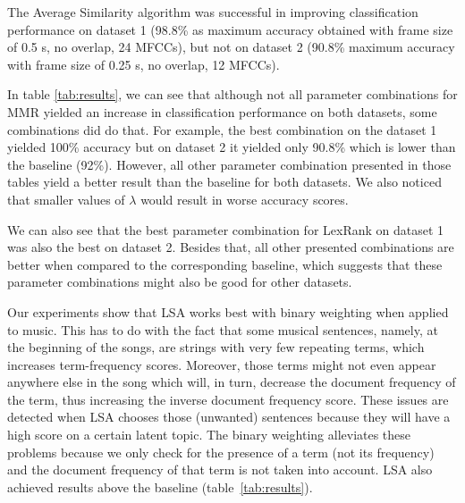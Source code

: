 \documentclass[11pt,onecolumn,draftcls]{IEEEtran}
\begin{document}
The Average Similarity algorithm was successful in improving classification
performance on dataset 1 (98.8\% as maximum accuracy obtained with frame size of
0.5 s, no overlap, 24 \ac{MFCC}s), but not on dataset 2 (90.8\% maximum accuracy
with frame size of 0.25 s, no overlap, 12 \ac{MFCC}s).

In table \ref{tab:results}, we can see that although not all parameter
combinations for \ac{MMR} yielded an increase in classification performance on
both datasets, some combinations did do that. For example, the best combination on
the dataset 1 yielded 100\% accuracy but on dataset 2 it yielded only 90.8\%
which is lower than the baseline (92\%). However, all other parameter
combination presented in those tables yield a better result than the baseline
for both datasets. We also noticed that smaller values of $\lambda$ would
result in worse accuracy scores.

We can also see that the best parameter combination for LexRank on dataset 1
was also the best on dataset 2. Besides that, all other presented combinations
are better when compared to the corresponding baseline, which suggests that these
parameter combinations might also be good for other datasets.

Our experiments show that \ac{LSA} works best with binary weighting when applied
to music. This has to do with the fact that some musical sentences, namely, at
the beginning of the songs, are strings with very few repeating terms, which
increases term-frequency scores. Moreover, those terms might not even appear
anywhere else in the song which will, in turn, decrease the document frequency
of the term, thus increasing the inverse document frequency score. These issues
are detected when \ac{LSA} chooses those (unwanted) sentences because they will
have a high score on a certain latent topic. The binary weighting alleviates
these problems because we only check for the presence of a term (not its
frequency) and the document frequency of that term is not taken into account.
\ac{LSA} also achieved results above the baseline (table~\ref{tab:results}).
\end{document}
